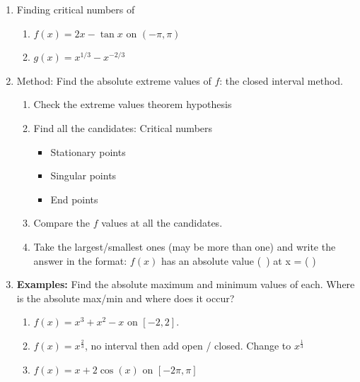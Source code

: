 \documentclass{article}
\begin{document}
\begin{enumerate}
\item Finding critical numbers of 
\begin{enumerate}
\item $f(x)=2x-\tan x$ on $(-\pi,\pi)$
\item $g(x)= x^{1/3}-x^{-2/3}$
\end{enumerate}

\item Method: Find the absolute extreme values of $f$: the closed interval method.
\begin{enumerate}
\item Check the extreme values theorem hypothesis
\item Find all the candidates: Critical numbers
\begin{itemize}
\item Stationary points
\item Singular points
\item End points
\end{itemize}
\item Compare the $f$ values at all the candidates.
\item Take the largest/smallest ones (may be more than one) and write the answer in the format: $f(x)$ has an absolute value (~) at x = ( )
\end{enumerate}


\item {\bf Examples:} Find the absolute maximum and minimum values of each. Where is the absolute max/min and where does it occur?
\begin{enumerate}
\item $f(x) = x^3+x^2-x$ on $[-2,2]$. 
\item $f(x) = x^{\frac{2}{3}}$, no interval then add open / closed. Change to $x^\frac{1}{3}$
\item $f(x) = x + 2\cos(x)$ on $[-2\pi,\pi]$
\end{enumerate}
\end{enumerate}	



\end{document}
